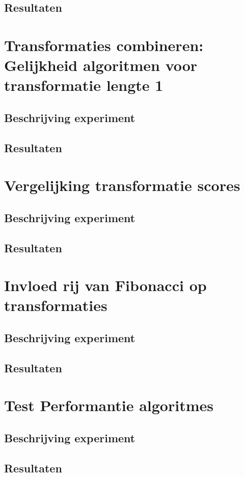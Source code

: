 \subsection{Resultaten}

\section{Transformaties combineren: Gelijkheid algoritmen voor transformatie lengte 1}
\label{experiment:4}
\subsection{Beschrijving experiment}

\subsection{Resultaten}

\section{Vergelijking transformatie scores}
\label{experiment:5}
\subsection{Beschrijving experiment}

\subsection{Resultaten}

\section{Invloed rij van Fibonacci op transformaties}
\label{experiment:6}
\subsection{Beschrijving experiment}

\subsection{Resultaten}

\section{Test Performantie algoritmes}
\label{experiment:7}
\subsection{Beschrijving experiment}

\subsection{Resultaten}

